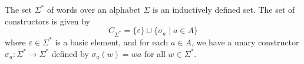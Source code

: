 \begin{example}
The set $\Sigma^*$ of words over an alphabet $\Sigma$ is an inductively defined set. The set of constructors is given by
\[ C_{\Sigma^*} = \{ \varepsilon \} \cup \{ \sigma_a \mid a \in A \} \]
where $\varepsilon \in \Sigma^*$ is a basic element, and for each $a \in A$, we have a unary constructor $\sigma_a : \Sigma^* \to \Sigma^*$ defined by $\sigma_a(w) = wa$ for all $w \in \Sigma^*$.


\end{example}

